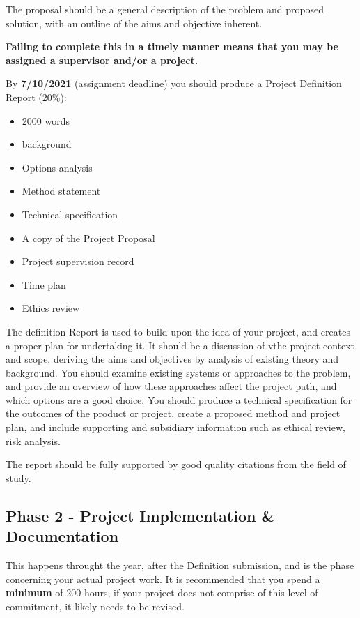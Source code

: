 The proposal should be a general description of the problem and proposed solution, with an outline of the aims and objective inherent. 

\medskip

\textbf{Failing to complete this in a timely manner means that you may be assigned a supervisor and/or a project.}

\medskip

By \textbf{7/10/2021} (assignment deadline) you should produce a Project Definition Report (20\%):

\begin{itemize}
    \item 2000 words
    \item background
    \item Options analysis
    \item Method statement
    \item Technical specification
    \item A copy of the Project Proposal
    \item Project supervision record
    \item Time plan
    \item Ethics review
\end{itemize}

The definition Report is used to build upon the idea of your project, and creates a proper plan for undertaking it. It should be a discussion of vthe project context and scope, deriving the aims and objectives by analysis of existing theory and background. You should examine existing systems or approaches to the problem, and provide an overview of how these approaches affect the project path, and which options are a good choice. You should produce a technical specification for the outcomes of the product or project, create a proposed method and project plan, and include supporting and subsidiary information such as ethical review, risk analysis. 

The report should be fully supported by good quality citations from the field of study.

\subsection{Phase 2 - Project Implementation \& Documentation}

This happens throught the year, after the Definition submission, and is the phase concerning your actual project work. It is recommended that you spend a \textbf{minimum} of 200 hours, if your project does not comprise of this level of commitment, it likely needs to be revised.

